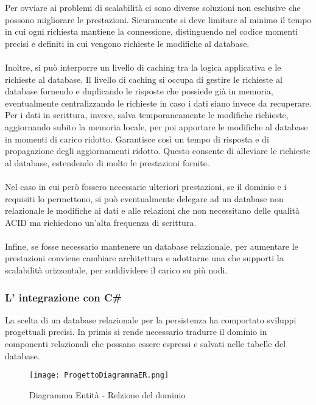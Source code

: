 Per ovviare ai problemi di scalabilità ci sono diverse soluzioni non esclusive che possono migliorare le prestazioni. 
Sicuramente si deve limitare al minimo il tempo in cui ogni richiesta mantiene la connessione, 
distinguendo nel codice momenti precisi e definiti in cui vengono richieste le modifiche al database. \\
\\  

Inoltre, si può interporre un livello di caching tra la logica applicativa e le richieste al database. 
Il livello di caching si occupa di gestire le richieste al database fornendo e duplicando le risposte che possiede già in memoria, 
eventualmente centralizzando le richieste in caso i dati siano invece da recuperare. 
Per i dati in scrittura, invece, salva temporaneamente le modifiche richieste, aggiornando subito la memoria locale, 
per poi apportare le modifiche al database in momenti di carico ridotto. 
Garantisce così un tempo di risposta e di propagazione degli aggiornamenti ridotto. 
Questo consente di alleviare le richieste al database, estendendo di molto le prestazioni fornite.\\
\\

Nel caso in cui però fossero necessarie ulteriori prestazioni, se il dominio e i requisiti lo permettono, 
si può eventualmente delegare ad un database non relazionale le modifiche ai dati e alle relazioni che non necessitano delle qualità ACID ma richiedono un’alta frequenza di scrittura.\\
\\ 
Infine, se fosse necessario mantenere un database relazionale, 
per aumentare le prestazioni conviene cambiare architettura e adottarne una che supporti la scalabilità orizzontale, per suddividere il carico su più nodi.
\clearpage


\subsubsection{L' integrazione con C\#}

La scelta di un database relazionale per la persistenza ha comportato sviluppi progettuali precisi. 
In primis si rende necessario tradurre il dominio in componenti relazionali che possano essere espressi e salvati nelle tabelle del database.

\begin{figure}[h!]
    \centering
    \texttt{[image: ProgettoDiagrammaER.png]}
    \caption{Diagramma Entità - Relzione del dominio}
\end{figure}	

